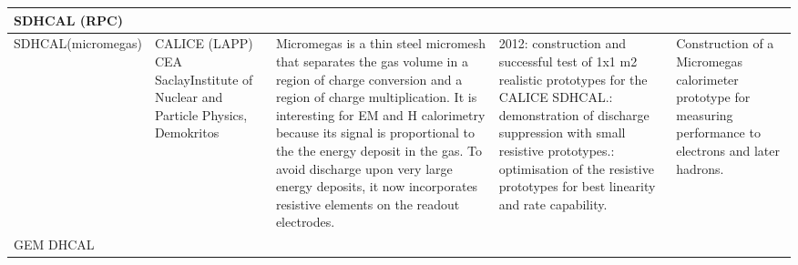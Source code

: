 \begin{landscape}
\begin{sidewaystable}
\begin{adjustbox}{max width=1.1\textwidth,totalheight=1\textheight}
\begin{tabularx}{2\textheight}{lXXXX}
     \midrule
    SDHCAL (RPC)                                                                                                   &                                                                                                                                         &                                                                                                                                                                                                                                                                                                                                                                                      &                                                                                                                                                                                                                                                                 &                                                                                                                                                                                                                                     \\
    \midrule
    SDHCAL(micromegas) &
     CALICE (LAPP) \newline CEA Saclay\newline Institute of Nuclear and Particle Physics, Demokritos                                                            &
      Micromegas is a thin steel micromesh that separates the gas volume in a region of charge conversion and a region of charge multiplication. It is interesting for EM and H calorimetry because its signal is proportional to the the energy deposit in the gas. To avoid discharge upon very large energy deposits, it now incorporates resistive elements on the readout electrodes. &
       2012: construction and successful test of 1x1 m2 realistic prototypes for the CALICE SDHCAL.\newline
       2014: demonstration of discharge suppression with small resistive prototypes.\newline
       2015: optimisation of the resistive prototypes for best linearity and rate capability. &
       Construction of a Micromegas calorimeter prototype for measuring performance to electrons and later hadrons.                                                                                                                        \\
       \midrule
    GEM DHCAL &

\end{tabularx}
\end{adjustbox}
\end{sidewaystable}
\end{landscape}
